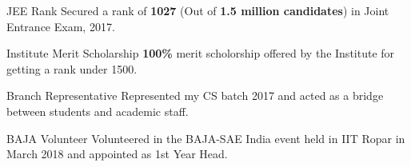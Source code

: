 
\begin{misc}


\cvskill

    \cvskill
    {JEE Rank} %
    {{Secured a rank of }\textbf{1027} { (Out of \textbf{1.5 million candidates}) }{in Joint Entrance Exam, 2017.}}
 
\cvskill
    {Institute Merit Scholarship} %
    {{\textbf{100\%} merit scholorship offered by the Institute for getting a rank under 1500.}}

\cvskill
{Branch Representative} %
{{Represented my CS batch 2017 and acted as a bridge between students and academic staff.}}

\cvskill
    {BAJA Volunteer} %
    {{Volunteered in the BAJA-SAE India event held in IIT Ropar in March 2018 and appointed as 1st Year Head.}}


\end{misc}
